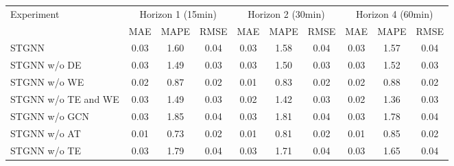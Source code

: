 \begin{tabular}{lccccccccc}
\toprule
Experiment & \multicolumn{3}{c}{Horizon 1 (15min)} & \multicolumn{3}{c}{Horizon 2 (30min)} & \multicolumn{3}{c}{Horizon 4 (60min)} \\
 & MAE & MAPE & RMSE & MAE & MAPE & RMSE & MAE & MAPE & RMSE \\
\midrule
STGNN & 0.03 & 1.60 & 0.04 & 0.03 & 1.58 & 0.04 & 0.03 & 1.57 & 0.04 \\
STGNN w/o DE & 0.03 & 1.49 & 0.03 & 0.03 & 1.50 & 0.03 & 0.03 & 1.52 & 0.03 \\
STGNN w/o WE & 0.02 & 0.87 & 0.02 & 0.01 & 0.83 & 0.02 & 0.02 & 0.88 & 0.02 \\
STGNN w/o TE and WE & 0.03 & 1.49 & 0.03 & 0.02 & 1.42 & 0.03 & 0.02 & 1.36 & 0.03 \\
STGNN w/o GCN & 0.03 & 1.85 & 0.04 & 0.03 & 1.81 & 0.04 & 0.03 & 1.78 & 0.04 \\
STGNN w/o AT & 0.01 & 0.73 & 0.02 & 0.01 & 0.81 & 0.02 & 0.01 & 0.85 & 0.02 \\
STGNN w/o TE & 0.03 & 1.79 & 0.04 & 0.03 & 1.71 & 0.04 & 0.03 & 1.65 & 0.04 \\
\bottomrule
\end{tabular}
